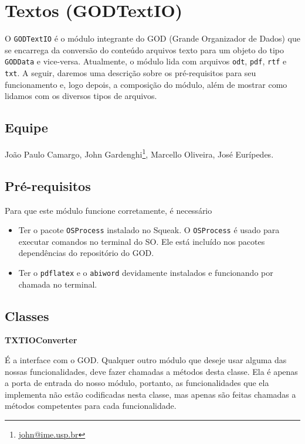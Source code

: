 \section{Textos (GODTextIO)}

O \verb|GODTextIO| é o módulo integrante do GOD (Grande Organizador de
Dados) que se encarrega da conversão do conteúdo arquivos texto para
um objeto do tipo \verb|GODData| e vice-versa. Atualmente, o módulo
lida com arquivos \verb|odt|, \verb|pdf|, \verb|rtf| e \verb|txt|. A
seguir, daremos uma descrição sobre os pré-requisitos para seu
funcionamento e, logo depois, a composição do módulo, além de mostrar
como lidamos com os diversos tipos de arquivos.

\subsection{Equipe}

João Paulo Camargo, John
Gardenghi\footnote{\href{mailto:john@ime.usp.br}{john@ime.usp.br}},
Marcello Oliveira, José Eurípedes.


\subsection{Pré-requisitos}

Para que este módulo funcione corretamente, é necessário
\begin{itemize}
\item Ter o pacote \verb|OSProcess| instalado no Squeak. O \verb|OSProcess| é usado para executar comandos no terminal do SO. Ele está incluído nos pacotes dependências do repositório do GOD.
\item Ter o \verb|pdflatex| e o \verb|abiword| devidamente instalados e funcionando por chamada no terminal.
\end{itemize}

\subsection{Classes}

\vspace{1em}
\textbf{TXTIOConverter}

É a interface com o GOD. Qualquer outro módulo que deseje usar alguma
das nossas funcionalidades, deve fazer chamadas a métodos desta
classe. Ela é apenas a porta de entrada do nosso módulo, portanto, as
funcionalidades que ela implementa não estão codificadas nesta classe,
mas apenas são feitas chamadas a métodos competentes para cada
funcionalidade.

